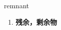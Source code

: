 
\begin{frame}
{\huge remnant}
\begin{center}
\begin{enumerate}\Large
  \item \textbf{残余，剩余物}
\end{enumerate}
\end{center}
\end{frame}
